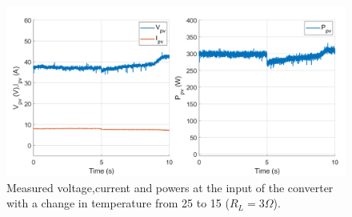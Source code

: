 \begin{figure}[H]
	\begin{center}
		\includegraphics[width=1\textwidth]{../Pictures/P1/Test/Buck_mode_MPPT_Vin_Iin_Pin_temperature_change}
		\caption{Measured voltage,current and powers at the input of the converter with a change in temperature from 25 to 15 ($R_{L}=3\Omega$).}
		\label{MPPTtestbuckmodet}
	\end{center}	
\end{figure}